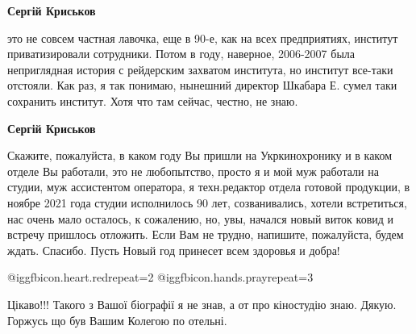 \begin{itemize}
\begin{itemize}
\textbf{Сергій Криськов} 

это не совсем частная лавочка, еще в 90-е, как на всех предприятиях, институт
приватизировали сотрудники. Потом в году, наверное, 2006-2007 была неприглядная
история с рейдерским захватом института, но институт все-таки отстояли. Как
раз, я так понимаю, нынешний директор Шкабара Е. сумел таки сохранить институт.
Хотя что там сейчас, честно, не знаю.

\textbf{Сергій Криськов} 

Скажите, пожалуйста, в каком году Вы пришли на Укркинохронику и в каком отделе
Вы работали, это не любопытство, просто я и мой муж работали на студии, муж
ассистентом оператора, я техн.редактор отдела готовой продукции, в ноябре 2021
года студии исполнилось 90 лет, созванивались, хотели встретиться, нас очень
мало осталось, к сожалению, но, увы, начался новый виток ковид и встречу
пришлось отложить. Если Вам не трудно, напишите, пожалуйста, будем ждать.
Спасибо. Пусть Новый год принесет всем здоровья и добра!

@igg{fbicon.heart.red}{repeat=2} @igg{fbicon.hands.pray}{repeat=3} 
\end{itemize} %


Цікаво!!! Такого з Вашої біографії я не знав, а от про кіностудію знаю. Дякую.
Горжусь що був Вашим Колегою по отельні.

\end{itemize} %
